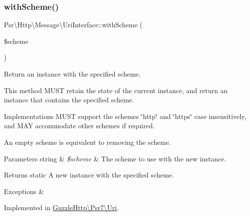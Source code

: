 \mbox{\label{interfacePsr_1_1Http_1_1Message_1_1UriInterface_af1eb8a046537a32fe08bc90f6debb9c6}} 
\subsubsection{\texorpdfstring{with\+Scheme()}{withScheme()}}
{\footnotesize\ttfamily Psr\textbackslash{}\+Http\textbackslash{}\+Message\textbackslash{}\+Uri\+Interface\+::with\+Scheme (\begin{DoxyParamCaption}\item[{}]{\$scheme }\end{DoxyParamCaption})}

Return an instance with the specified scheme.

This method M\+U\+ST retain the state of the current instance, and return an instance that contains the specified scheme.

Implementations M\+U\+ST support the schemes \char`\"{}http\char`\"{} and \char`\"{}https\char`\"{} case insensitively, and M\+AY accommodate other schemes if required.

An empty scheme is equivalent to removing the scheme.


\begin{DoxyParams}[1]{Parameters}
string & {\em \$scheme} & The scheme to use with the new instance. \\
\hline
\end{DoxyParams}
\begin{DoxyReturn}{Returns}
static A new instance with the specified scheme. 
\end{DoxyReturn}

\begin{DoxyExceptions}{Exceptions}
{\em } & \\
\hline
\end{DoxyExceptions}


Implemented in \hyperlink{classGuzzleHttp_1_1Psr7_1_1Uri_aca8720e1011bf77b98a02b47fb4b3c12}{Guzzle\+Http\textbackslash{}\+Psr7\textbackslash{}\+Uri}.

\mbox{\label{interfacePsr_1_1Http_1_1Message_1_1UriInterface_aeee034680ed8e5066fb6b2c671a2005f}} 
